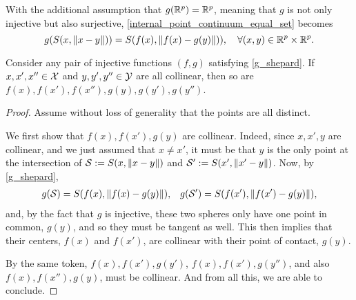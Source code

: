 \documentclass[twoside, 11pt]{article}
\begin{document}
With the additional assumption that $g(\mathbb{R}^p) = \mathbb{R}^p$, meaning that $g$ is not only injective but also surjective, \eqref{internal_point_continuum_equal_set} becomes
\begin{equation}\label{g_shepard}
g(S(x, \|x-y\|)) = S(f(x), \|f(x)-g(y)\|)), \quad \forall (x,y) \in \mathbb{R}^p \times \mathbb{R}^p.
\end{equation}

\begin{lemma} \label{lem:fffggg}
Consider any pair of injective functions $(f,g)$ satisfying \eqref{g_shepard}. If $x, x', x'' \in \mathcal{X}$ and $y, y', y'' \in \mathcal{Y}$ are all collinear, then so are $f(x), f(x'), f(x''), g(y), g(y'), g(y'')$.
\end{lemma}

\begin{proof}
Assume without loss of generality that the points are all distinct. 

We first show that $f(x), f(x'), g(y)$ are collinear.
Indeed, since $x,x',y$ are collinear, and we just assumed that $x \ne x'$, it must be that $y$ is the only point at the intersection of $\mathcal{S} := S(x, \|x-y\|)$ and $\mathcal{S}' := S(x', \|x'-y\|)$.
Now, by \eqref{g_shepard}, 
\begin{align}
g(\mathcal{S}) = S(f(x), \|f(x)-g(y)\|), && g(\mathcal{S}') = S(f(x'), \|f(x')-g(y)\|),
\end{align}
and, by the fact that $g$ is injective, these two spheres only have one point in common, $g(y)$, and so they must be tangent as well. This then implies that their centers, $f(x)$ and $f(x')$, are collinear with their point of contact, $g(y)$. 

By the same token, $f(x), f(x'), g(y')$, $f(x), f(x'), g(y'')$, and also $f(x), f(x''), g(y)$, must be collinear. And from all this, we are able to conclude.
\end{proof}
\end{document}
